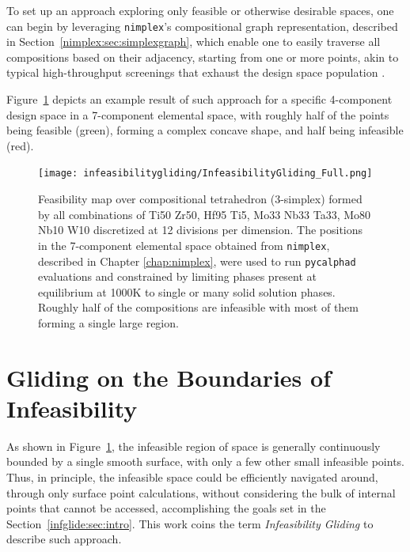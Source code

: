 To set up an approach exploring only feasible or otherwise desirable spaces, one can begin by leveraging \texttt{nimplex}'s compositional graph representation, described in Section~\ref{nimplex:sec:simplexgraph}, which enable one to easily traverse all compositions based on their adjacency, starting from one or more points, akin to typical high-throughput screenings that exhaust the design space population \cite{Feng2021High-throughputAlloys, Wang2023SearchingExperiments, Yang2022AHardness, Maresca2020Mechanistic1900K}.

Figure~\ref{infeasibilitygliding:fig:fullcomputation} depicts an example result of such approach for a specific 4-component design space in a 7-component elemental space, with roughly half of the points being feasible (green), forming a complex concave shape, and half being infeasible (red).

\begin{figure}[H]
    \centering
    \texttt{[image: infeasibilitygliding/InfeasibilityGliding\_Full.png]}
    \caption{Feasibility map over compositional tetrahedron (3-simplex) formed by all combinations of Ti50 Zr50, Hf95 Ti5, Mo33 Nb33 Ta33, Mo80 Nb10 W10 discretized at 12 divisions per dimension. The positions in the 7-component elemental space obtained from \texttt{nimplex}, described in Chapter \ref{chap:nimplex}, were used to run \texttt{pycalphad} \cite{Otis2017Pycalphad:Python} evaluations and constrained by limiting phases present at equilibrium at 1000K to single or many solid solution phases. Roughly half of the compositions are infeasible with most of them forming a single large region.}
    \label{infeasibilitygliding:fig:fullcomputation}
\end{figure}

\section{Gliding on the Boundaries of Infeasibility} \label{infglide:sec:glide}

As shown in Figure~\ref{infeasibilitygliding:fig:fullcomputation}, the infeasible region of space is generally continuously bounded by a single smooth surface, with only a few other small infeasible points. Thus, in principle, the infeasible space could be efficiently navigated around, through only surface point calculations, without considering the bulk of internal points that cannot be accessed, accomplishing the goals set in the Section~\ref{infglide:sec:intro}. This work coins the term \emph{Infeasibility Gliding} to describe such approach.

